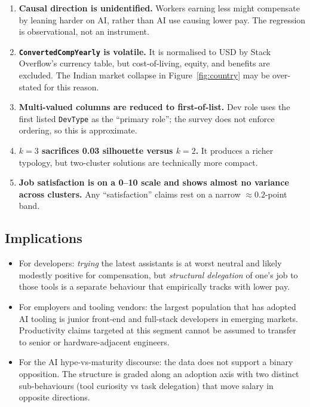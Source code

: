 \documentclass[11pt,a4paper]{article}
\begin{document}
\begin{enumerate}[leftmargin=2em]
  \item \textbf{Causal direction is unidentified.} Workers earning less
        might compensate by leaning harder on AI, rather than AI use
        causing lower pay. The regression is observational, not an
        instrument.
  \item \textbf{\texttt{ConvertedCompYearly} is volatile.} It is
        normalised to USD by Stack Overflow's currency table, but
        cost-of-living, equity, and benefits are excluded. The Indian
        market collapse in Figure~\ref{fig:country} may be over-stated
        for this reason.
  \item \textbf{Multi-valued columns are reduced to first-of-list.}
        Dev role uses the first listed \texttt{DevType} as the ``primary
        role''; the survey does not enforce ordering, so this is
        approximate.
  \item \textbf{$k=3$ sacrifices 0.03 silhouette versus $k=2$.} It
        produces a richer typology, but two-cluster solutions are
        technically more compact.
  \item \textbf{Job satisfaction is on a 0--10 scale and shows almost no
        variance across clusters.} Any ``satisfaction'' claims rest on a
        narrow $\approx 0.2$-point band.
\end{enumerate}

\subsection{Implications}

\begin{itemize}[leftmargin=2em]
  \item For developers: \emph{trying} the latest assistants is at worst
        neutral and likely modestly positive for compensation, but
        \emph{structural delegation} of one's job to those tools is a
        separate behaviour that empirically tracks with lower pay.
  \item For employers and tooling vendors: the largest population that
        has adopted AI tooling is junior front-end and full-stack
        developers in emerging markets. Productivity claims targeted at
        this segment cannot be assumed to transfer to senior or
        hardware-adjacent engineers.
  \item For the AI hype-vs-maturity discourse: the data does not support
        a binary opposition. The structure is graded along an adoption
        axis with two distinct sub-behaviours (tool curiosity vs task
        delegation) that move salary in opposite directions.
\end{itemize}
\end{document}
